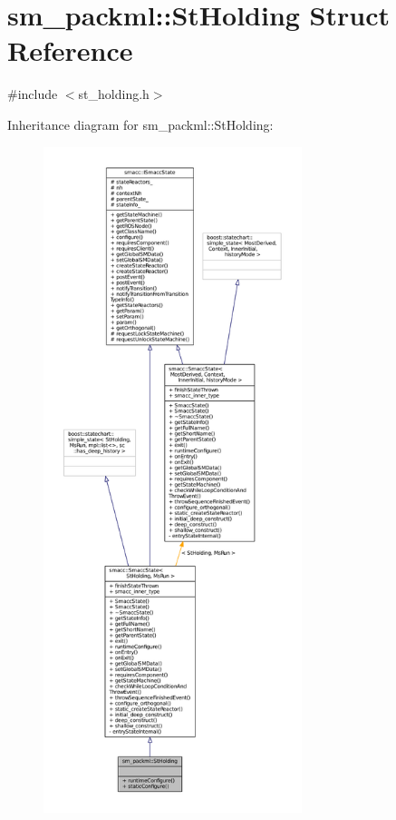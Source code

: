 \hypertarget{structsm__packml_1_1StHolding}{}\section{sm\+\_\+packml\+:\+:St\+Holding Struct Reference}
\label{structsm__packml_1_1StHolding}


{\ttfamily \#include $<$st\+\_\+holding.\+h$>$}



Inheritance diagram for sm\+\_\+packml\+:\+:St\+Holding\+:
\nopagebreak
\begin{figure}[H]
\begin{center}
\leavevmode
\includegraphics[height=550pt]{structsm__packml_1_1StHolding__inherit__graph}
\end{center}
\end{figure}


